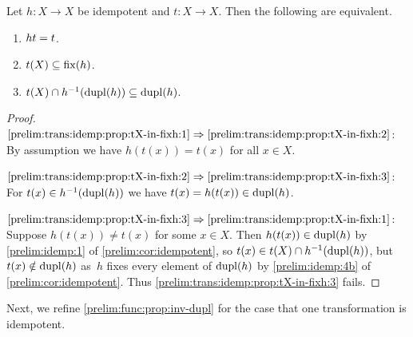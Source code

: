 \begin{proposition} \label{prelim:trans:idemp:prop:tX-in-fixh}
	Let $h \colon X \to X$ be idempotent and $t \colon X \to X$.
	Then the following are equivalent.
	\begin{enumerate}
		\item \label{prelim:trans:idemp:prop:tX-in-fixh:1} $\concat{t}{h} = t$.
		
		\item \label{prelim:trans:idemp:prop:tX-in-fixh:2} $t(X) \subseteq \fix{h}$.
		
		\item \label{prelim:trans:idemp:prop:tX-in-fixh:3} $t(X) \cap h^{-1}(\dupl{h}) \subseteq \dupl{h}$.
	\end{enumerate}
\end{proposition}
\begin{proof}
	$\ref{prelim:trans:idemp:prop:tX-in-fixh:1} \Rightarrow \ref{prelim:trans:idemp:prop:tX-in-fixh:2}$:
	By assumption we have $h(t(x)) = t(x)$ for all $x \in X$.
	
	$\ref{prelim:trans:idemp:prop:tX-in-fixh:2} \Rightarrow \ref{prelim:trans:idemp:prop:tX-in-fixh:3}$:
	For $t(x) \in h^{-1}(\dupl{h})$ we have $t(x) = h(t(x)) \in \dupl{h}$.
	
	$\ref{prelim:trans:idemp:prop:tX-in-fixh:3} \Rightarrow \ref{prelim:trans:idemp:prop:tX-in-fixh:1}$:
	Suppose $h(t(x)) \ne t(x)$ for some $x \in X$.
	Then $h(t(x)) \in \dupl{h}$ by \cref{prelim:idemp:1} of
	\cref{prelim:cor:idempotent}, so $t(x) \in t(X) \cap h^{-1}(\dupl{h})$, but
	$t(x) \notin \dupl{h}$ as~$h$ fixes every element of $\dupl{h}$ by
	\cref{prelim:idemp:4b} of \cref{prelim:cor:idempotent}.
	Thus \cref{prelim:trans:idemp:prop:tX-in-fixh:3} fails.
\end{proof}

Next, we refine \cref{prelim:func:prop:inv-dupl} for the case that one transformation is idempotent. 

